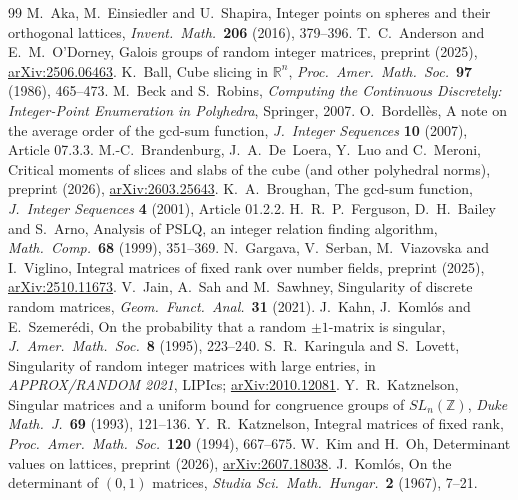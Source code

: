 \documentclass[11pt]{article}
\theoremstyle{definition}
\begin{document}
\begin{thebibliography}{99}\small
{} M.~Aka, M.~Einsiedler and U.~Shapira, Integer points on spheres and their orthogonal lattices, \emph{Invent.\ Math.}\ \textbf{206} (2016), 379--396.
 T.~C.~Anderson and E.~M.~O'Dorney, Galois groups of random integer matrices, preprint (2025), \href{https://arxiv.org/abs/2506.06463}{arXiv:2506.06463}.
 K.~Ball, Cube slicing in $\mathbb{R}^n$, \emph{Proc.\ Amer.\ Math.\ Soc.}\ \textbf{97} (1986), 465--473.
 M.~Beck and S.~Robins, \emph{Computing the Continuous Discretely: Integer-Point Enumeration in Polyhedra}, Springer, 2007.
 O.~Bordell\`es, A note on the average order of the gcd-sum function, \emph{J.\ Integer Sequences} \textbf{10} (2007), Article 07.3.3.
 M.-C.~Brandenburg, J.~A.~De~Loera, Y.~Luo and C.~Meroni, Critical moments of slices and slabs of the cube (and other polyhedral norms), preprint (2026), \href{https://arxiv.org/abs/2603.25643}{arXiv:2603.25643}.
 K.~A.~Broughan, The gcd-sum function, \emph{J.\ Integer Sequences} \textbf{4} (2001), Article 01.2.2.
 H.~R.~P.~Ferguson, D.~H.~Bailey and S.~Arno, Analysis of PSLQ, an integer relation finding algorithm, \emph{Math.\ Comp.}\ \textbf{68} (1999), 351--369.
 N.~Gargava, V.~Serban, M.~Viazovska and I.~Viglino, Integral matrices of fixed rank over number fields, preprint (2025), \href{https://arxiv.org/abs/2510.11673}{arXiv:2510.11673}.
 V.~Jain, A.~Sah and M.~Sawhney, Singularity of discrete random matrices, \emph{Geom.\ Funct.\ Anal.}\ \textbf{31} (2021).
 J.~Kahn, J.~Koml\'os and E.~Szemer\'edi, On the probability that a random $\pm1$-matrix is singular, \emph{J.\ Amer.\ Math.\ Soc.}\ \textbf{8} (1995), 223--240.
 S.~R.~Karingula and S.~Lovett, Singularity of random integer matrices with large entries, in \emph{APPROX/RANDOM 2021}, LIPIcs; \href{https://arxiv.org/abs/2010.12081}{arXiv:2010.12081}.
 Y.~R.~Katznelson, Singular matrices and a uniform bound for congruence groups of $SL_n(\mathbb{Z})$, \emph{Duke Math.\ J.}\ \textbf{69} (1993), 121--136.
 Y.~R.~Katznelson, Integral matrices of fixed rank, \emph{Proc.\ Amer.\ Math.\ Soc.}\ \textbf{120} (1994), 667--675.
 W.~Kim and H.~Oh, Determinant values on lattices, preprint (2026), \href{https://arxiv.org/abs/2607.18038}{arXiv:2607.18038}.
 J.~Koml\'os, On the determinant of $(0,1)$ matrices, \emph{Studia Sci.\ Math.\ Hungar.}\ \textbf{2} (1967), 7--21.

\end{thebibliography}
\end{document}

